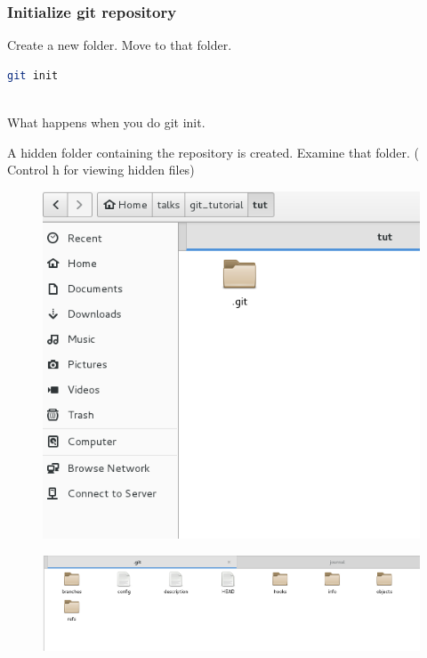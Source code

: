 \documentclass[10pt,a4paper]{beamer}
\begin{document}
\begin{frame}[fragile]
\frametitle{  Initialize git repository}

Create a new folder. Move to that folder.
\begin{lstlisting}[language=bash]
 git init
 
\end{lstlisting}
\pause

What happens when you do git init.  

A hidden folder containing the repository is created. Examine that folder. ( Control h for viewing hidden files)

 \begin{figure}
  \includegraphics[scale=.4]{2}
 \end{figure}
 
  \begin{figure}
  \includegraphics[scale=.4]{3}
 \end{figure}
\end{frame}
\end{document}
